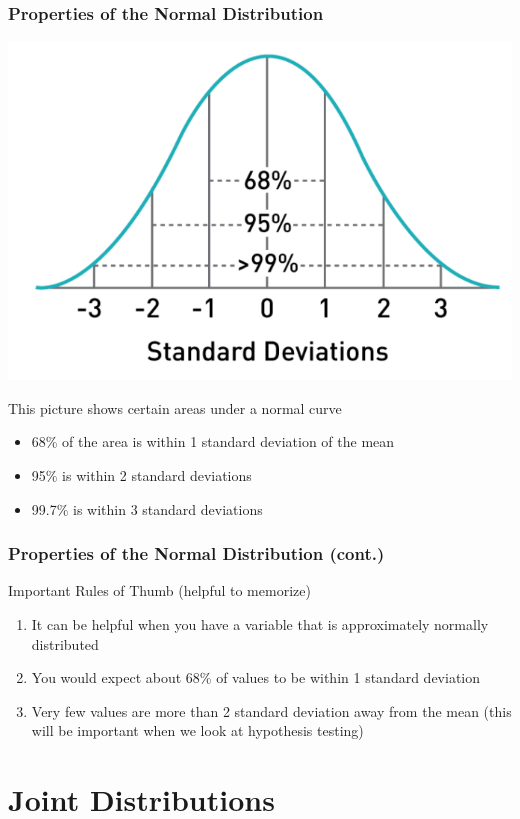 \documentclass[12pt, block=fill]{beamer}
\begin{document}
\begin{frame}
  \frametitle{Properties of the Normal Distribution}
  \begin{center}
      \includegraphics[width=0.5\linewidth]{figures/properties_normal_distribution.png}
  \end{center}
  This picture shows certain areas under a normal curve
  \begin{itemize}
      \item 68\% of the area is within 1 standard deviation of the mean
      \item 95\% is within 2 standard deviations
      \item 99.7\% is within 3 standard deviations
  \end{itemize}
\end{frame}

\begin{frame}
  \frametitle{Properties of the Normal Distribution (cont.)}
  \begin{exampleblock}{Important Rules of Thumb (helpful to memorize)}
    \begin{enumerate}
        \item It can be helpful when you have a variable that is approximately normally distributed
        \item You would expect about 68\% of values to be within 1 standard deviation
        \item Very few values are more than 2 standard deviation away from the mean (this will be important when we look at hypothesis testing)
    \end{enumerate}
  \end{exampleblock}
    
\end{frame}













\section{Joint Distributions}
\end{document}
